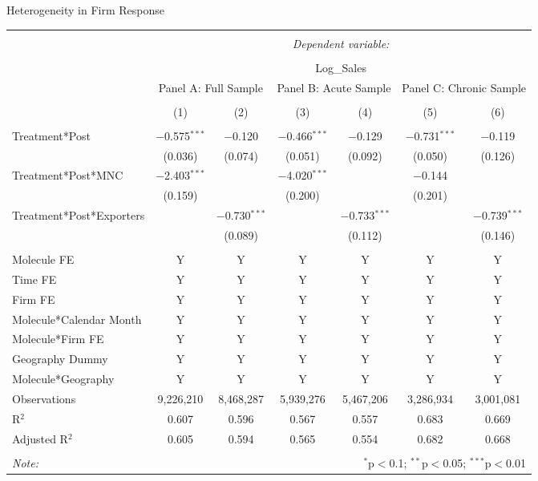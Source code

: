 \documentclass[aspectratio=43]{beamer}
\begin{document}
\begin{frame}[label= FirmHetero]{Heterogeneity in Firm Response}{}
	\begin{table}[H] \centering 
		\tiny 
		\begin{tabular}{@{\extracolsep{-10pt}}lcccccc} 
			\\[-1.8ex]\hline 
			\hline \\[-1.8ex] 
			& \multicolumn{6}{c}{\textit{Dependent variable:}} \\ 
			\cline{2-7} 
			\\[-1.8ex] & \multicolumn{6}{c}{Log\_Sales} \\ 
			& \multicolumn{2}{c}{Panel A: Full Sample} & \multicolumn{2}{c}{Panel B: Acute Sample} & \multicolumn{2}{c}{Panel C: Chronic Sample} \\ 
			\\[-1.8ex] & (1) & (2) & (3) & (4) & (5) & (6)\\ 
			\hline \\[-1.8ex] 
			Treatment*Post & $-$0.575$^{***}$ & $-$0.120 & $-$0.466$^{***}$ & $-$0.129 & $-$0.731$^{***}$ & $-$0.119 \\ 
			& (0.036) & (0.074) & (0.051) & (0.092) & (0.050) & (0.126) \\ 
			Treatment*Post*MNC & $-$2.403$^{***}$ &  & $-$4.020$^{***}$ &  & $-$0.144 &  \\ 
			& (0.159) &  & (0.200) &  & (0.201) &  \\ 
			Treatment*Post*Exporters &  & $-$0.730$^{***}$ &  & $-$0.733$^{***}$ &  & $-$0.739$^{***}$ \\ 
			&  & (0.089) &  & (0.112) &  & (0.146) \\ 
			\hline \\[-1.8ex] 
			Molecule FE & Y & Y & Y & Y & Y & Y \\ 
			Time FE & Y & Y & Y & Y & Y & Y \\ 
			Firm FE & Y & Y & Y & Y & Y & Y \\ 
			Molecule*Calendar Month & Y & Y & Y & Y & Y & Y \\ 
			Molecule*Firm FE & Y & Y & Y & Y & Y & Y \\ 
			Geography Dummy & Y & Y & Y & Y & Y & Y \\ 
			Molecule*Geography & Y & Y & Y & Y & Y & Y \\ 
			Observations & 9,226,210 & 8,468,287 & 5,939,276 & 5,467,206 & 3,286,934 & 3,001,081 \\ 
			R$^{2}$ & 0.607 & 0.596 & 0.567 & 0.557 & 0.683 & 0.669 \\ 
			Adjusted R$^{2}$ & 0.605 & 0.594 & 0.565 & 0.554 & 0.682 & 0.668 \\ 
			\hline 
			\hline \\[-1.8ex] 
			\textit{Note:}  & \multicolumn{6}{r}{$^{*}$p$<$0.1; $^{**}$p$<$0.05; $^{***}$p$<$0.01} \\ 
		\end{tabular} 
	\end{table} 
\end{frame}
\end{document}
